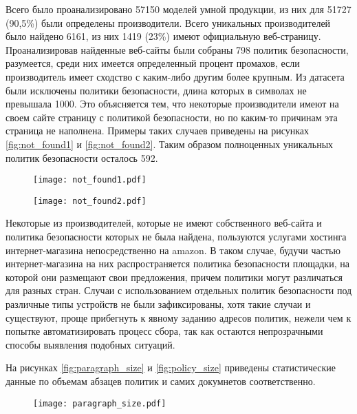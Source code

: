 \documentclass[../main]{subfiles}
\begin{document}
Всего было проанализировано 57150 моделей умной продукции, из них для 51727 (90,5\%) были определены производители. Всего уникальных производителей было найдено 6161, из них 1419 (23\%) имеют официальную веб-страницу. Проанализировав найденные веб-сайты были собраны 798 политик безопасности, разумеется, среди них имеется определенный процент промахов, если производитель имеет сходство с каким-либо другим более крупным. Из датасета были исключены политики безопасности, длина которых в символах не превышала 1000. Это объясняется тем, что некоторые производители имеют на своем сайте страницу с политикой безопасности, но по каким-то причинам эта страница не наполнена. Примеры таких случаев приведены на рисунках \ref{fig:not_found1} и \ref{fig:not_found2}. Таким образом полноценных уникальных политик безопасности осталось 592.

\begin{figure}[H]
    \centering
    {\texttt{[image: not\_found1.pdf]}}
    \vspace{-\baselineskip}
\end{figure}

\begin{figure}[H]
    \centering
    {\texttt{[image: not\_found2.pdf]}}
    \vspace{-\baselineskip}
\end{figure}

Некоторые из производителей, которые не имеют собственного веб-сайта и политика безопасности которых не была найдена, пользуются услугами хостинга интернет-магазина непосредственно на amazon. В таком случае, будучи частью интернет-магазина на них распространяется политика безопасности площадки, на которой они размещают свои предложения, причем политики могут различаться для разных стран. Случаи с использованием отдельных политик безопасности под различные типы устройств не были зафиксированы, хотя такие случаи и существуют, проще прибегнуть к явному заданию адресов политик, нежели чем к попытке автоматизировать процесс сбора, так как остаются непрозрачными способы выявления подобных ситуаций.

На рисунках \ref{fig:paragraph_size} и \ref{fig:policy_size} приведены статистические данные по объемам абзацев политик и самих докумнетов соответственно.

\begin{figure}[H]
    \centering
    {\texttt{[image: paragraph\_size.pdf]}}
    \vspace{-\baselineskip}
\end{figure}
\end{document}
